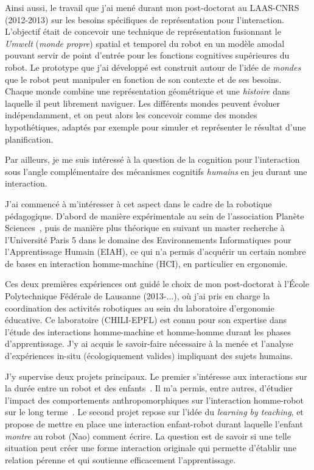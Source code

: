 \documentclass[a4paper]{article}
\begin{document}
Ainsi aussi, le travail que j'ai mené durant mon post-doctorat au LAAS-CNRS
(2012-2013) sur les besoins spécifiques de représentation pour l'interaction.
L'objectif était de concevoir une technique de représentation fusionnant le
\emph{Umwelt} (\emph{monde propre}) spatial et temporel du robot en un modèle
amodal pouvant servir de point d'entrée pour les fonctions cognitives
supérieures du robot. Le prototype que j'ai développé est construit autour de
l'idée de \emph{mondes} que le robot peut manipuler en fonction de son contexte
et de ses besoins.  Chaque monde combine une représentation géométrique et une
\emph{histoire} dans laquelle il peut librement naviguer. Les différents mondes
peuvent évoluer indépendamment, et on peut alors les concevoir comme des mondes
hypothétiques, adaptés par exemple pour simuler et représenter le résultat d'une
planification.

Par ailleurs, je me suis intéressé à la question de la cognition pour
l'interaction sous l'angle complémentaire des mécanismes cognitifs
\emph{humains} en jeu durant une interaction.

J'ai commencé à m'intéresser à cet aspect dans le cadre de la robotique
pédagogique. D'abord de manière expérimentale au sein de l'association Planète
Sciences~\cite{stinckwich2007squeakbot}, puis de manière plus théorique en
suivant un master recherche à l'Université Paris 5 dans le domaine des
Environnements Informatiques pour l'Apprentissage Humain (EIAH), ce qui n'a permis
d'acquérir un certain nombre de bases en interaction homme-machine (HCI), en
particulier en ergonomie.

Ces deux premières expériences ont guidé le choix de mon post-doctorat à l'École
Polytechnique Fédérale de Lausanne (2013-...), où j'ai pris en charge la
coordination des activités robotiques au sein du laboratoire d'ergonomie
éducative. Ce laboratoire (CHILI-EPFL) est connu pour son expertise dans l'étude
des interactions homme-machine et homme-homme durant les phases d'apprentissage.
J'y ai acquis le savoir-faire nécessaire à la menée et l'analyse d'expériences
in-situ (écologiquement valides) impliquant des sujets humains.

J'y supervise deux projets principaux. Le premier s'intéresse aux interactions
sur la durée entre un robot et des enfants~\cite{fink2014which}. Il m'a
permis, entre autres, d'étudier l'impact des comportements anthropomorphiques
sur l'interaction homme-robot sur le long terme~\cite{lemaignan2014dynamics}. Le
second projet repose sur l'idée du \emph{learning by teaching}, et propose de
mettre en place une interaction enfant-robot durant laquelle l'enfant
\emph{montre} au robot (Nao) comment écrire. La question est de savoir si
une telle situation peut créer une forme interaction originale qui permette
d'établir une relation pérenne et qui soutienne efficacement l'apprentissage.
\end{document}
